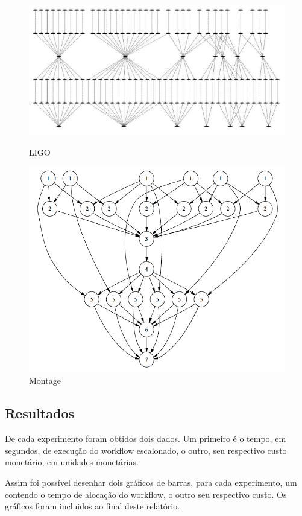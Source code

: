 \documentclass[a4paper,10pt]{article}
\begin{document}
\begin{figure}[!htb]
\includegraphics[scale=.25]{figures/ligo.png}
\caption{LIGO \protect\cite{bit}}
\label{ligo}

\includegraphics[scale=.25]{figures/montage.png}
\caption{Montage \protect\cite{bit}}
\label{montage}

\end{figure}

\subsection{Resultados}

De cada experimento foram obtidos dois dados. Um primeiro é o tempo, em segundos,
de execução do workflow escalonado, o outro, seu respectivo custo monetário, em 
unidades monetárias.

Assim foi possível desenhar dois gráficos de barras, para cada experimento, um
contendo o tempo de alocação do workflow, o outro seu respectivo custo. Os gráficos
foram incluidos ao final deste relatório.
\end{document}
